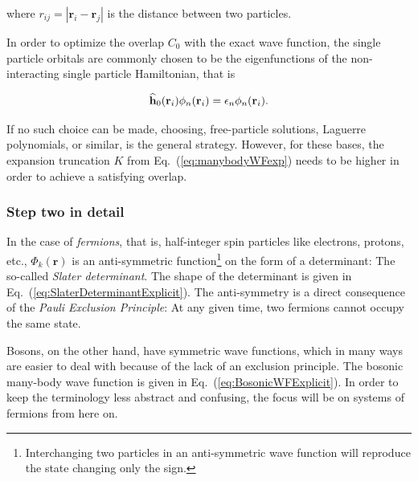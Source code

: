 where $r_{ij} = |\mathbf{r}_i - \mathbf{r}_j|$ is the distance between two particles.

In order to optimize the overlap $C_0$ with the exact wave function, the single particle orbitals are commonly chosen to be the eigenfunctions of the non-interacting single particle Hamiltonian, that is

\begin{equation}
\label{eq:orbitalEigenEq}
 {\bf\widehat{h}}_0(\mathbf{r}_i)\phi_n(\mathbf{r}_i) = \epsilon_n\phi_n(\mathbf{r}_i).
\end{equation}

If no such choice can be made, choosing, free-particle solutions, Laguerre polynomials, or similar, is the general strategy. However, for these bases, the expansion truncation $K$ from Eq.~(\ref{eq:manybodyWFexp}) needs to be higher in order to achieve a satisfying overlap.  


\subsubsection{Step two in detail}

In the case of \textit{fermions}, that is, half-integer spin particles like electrons, protons, etc., $\Phi_k(\mathbf{r})$ is an anti-symmetric function\footnote{Interchanging two particles in an anti-symmetric wave function will reproduce the state changing only the sign.} on the form of a determinant: The so-called \textit{Slater determinant}. The shape of the determinant is given in Eq.~(\ref{eq:SlaterDeterminantExplicit}). The anti-symmetry is a direct consequence of the \textit{Pauli Exclusion Principle}: At any given time, two fermions cannot occupy the same state. 

Bosons, on the other hand, have symmetric wave functions, which in many ways are easier to deal with because of the lack of an exclusion principle. The bosonic many-body wave function is given in Eq.~(\ref{eq:BosonicWFExplicit}). In order to keep the terminology less abstract and confusing, the focus will be on systems of fermions from here on.

